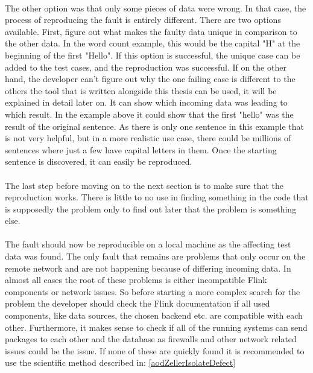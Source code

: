 \paragraph{} The other option was that only some pieces of data were wrong. In that case, the process of reproducing the fault is entirely different. There are two options available. First, figure out what makes the faulty data unique in comparison to the other data. In the word count example, this would be the capital "H" at the beginning of the first "Hello". If this option is successful, the unique case can be added to the test cases, and the reproduction was successful. If on the other hand, the developer can't figure out why the one failing case is different to the others the tool that is written alongside this thesis can be used, it will be explained in detail later on. It can show which incoming data was leading to which result. In the example above it could show that the first "hello" was the result of the original sentence. As there is only one sentence in this example that is not very helpful, but in a more realistic use case, there could be millions of sentences where just a few have capital letters in them. Once the starting sentence is discovered, it can easily be reproduced.

\paragraph{} The last step before moving on to the next section is to make sure that the reproduction works. There is little to no use in finding something in the code that is supposedly the problem only to find out later that the problem is something else.

\paragraph{} The fault should now be reproducible on a local machine as the affecting test data was found. The only fault that remains are problems that only occur on the remote network and are not happening because of differing incoming data. In almost all cases the root of these problems is either incompatible Flink components or network issues. So before starting a more complex search for the problem the developer should check the Flink documentation if all used components, like data sources, the chosen backend etc. are compatible with each other. Furthermore, it makes sense to check if all of the running systems can send packages to each other and the database as firewalls and other network related issues could be the issue. If none of these are quickly found it is recommended to use the scientific method described in: \ref{aodZellerIsolateDefect}

